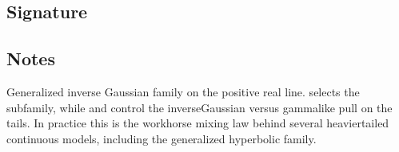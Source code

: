 \documentclass[letterpaper,10pt,english]{sphinxmanual}
\begin{document}
\subsection{Signature}
\label{\detokenize{distribution_catalog:id151}}
\begin{sphinxVerbatim}[commandchars=\\\{\}]
\end{sphinxVerbatim}


\subsection{Notes}
\label{\detokenize{distribution_catalog:id152}}
\sphinxAtStartPar
Generalized inverse Gaussian family on the positive real line.  selects the subfamily, while  and  control the inverse\sphinxhyphen{}Gaussian versus gamma\sphinxhyphen{}like pull on the tails. In practice this is the workhorse mixing law behind several heavier\sphinxhyphen{}tailed continuous models, including the generalized hyperbolic family.
\end{document}
